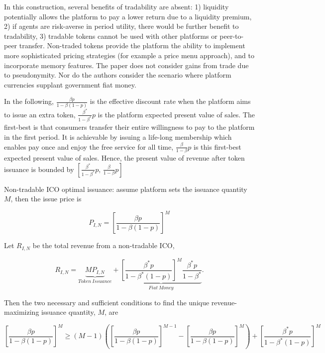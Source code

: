 In this construction, several benefits of tradability are absent: 1) liquidity potentially allows the platform to pay a lower return due to a liquidity premium, 2) if agents are risk-averse in period utility, there would be further benefit to tradability, 3) tradable tokens cannot be used with other platforms or peer-to-peer transfer. Non-traded tokens provide the platform the ability to implement more sophisticated pricing strategies (for example a price menu approach), and to incorporate memory features. The paper does not consider gains from trade due to pseudonymity. Nor do the authors consider the scenario where platform currencies supplant government fiat money.

In the following, $\frac{\beta p}{1-\beta(1-p)}$ is the effective discount rate when the platform aims to issue an extra token, $\frac{\beta^* }{1-\beta^*}p$ is the platform expected present value of sales. The first-best is that consumers transfer their entire willingness to pay to the platform in
the first period. It is achievable by issuing a life-long membership which enables pay once and
enjoy the free service for all time, $\frac{\beta}{1-\beta}p$ is this first-best expected present value of sales.  Hence, the present value of revenue after token issuance is bounded by $\left[{\frac{\beta^{*}}{1-\beta^{*}}}p,\,{\frac{\beta}{1-\beta}}p\right]$

Non-tradable ICO optimal issuance: assume platform sets the issuance quantity $M$, then the issue price is

\begin{equation}
    P_{I,N}=\left[\frac{\beta p}{1-\beta(1-p)}\right]^{M}
\end{equation}

Let $R_{I,N}$ be the total revenue from a non-tradable ICO,

\begin{equation}
    R_{I,N} = \underbrace{M P_{I,N}}_{Token~Issuance}
    +
    \underbrace{\left[\frac{\beta^{*}p}{1-\beta^{*}(1-p)}\right]^{M}
    \frac{\beta^{*}p}{1-\beta^{*}}}_{Fiat~Money}.
\end{equation}

Then the two necessary and sufficient conditions to find the unique revenue-maximizing issuance quantity, $M$, are

\begin{equation}
    \left[\frac{\beta p}{1-\beta(1-p)}\right]^{M}\geq(M-1)\left(\left[\frac{\beta p}{1-\beta(1-p)}\right]^{M-1}-\left[\frac{\beta p}{1-\beta(1-p)}\right]^{M}\right)+\left[\frac{\beta^{*}p}{1-\beta^{*}(1-p)}\right]^{M}
\end{equation}

